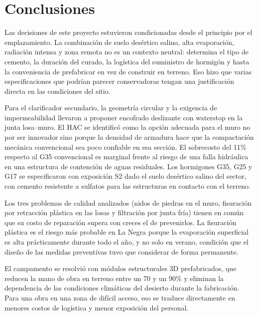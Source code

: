 \section{Conclusiones}

Las decisiones de este proyecto estuvieron condicionadas desde el principio por el emplazamiento. La combinación de suelo desértico salino, alta evaporación, radiación intensa y zona remota no es un contexto neutral: determina el tipo de cemento, la duración del curado, la logística del suministro de hormigón y hasta la conveniencia de prefabricar en vez de construir en terreno. Eso hizo que varias especificaciones que podrían parecer conservadoras tengan una justificación directa en las condiciones del sitio.

Para el clarificador secundario, la geometría circular y la exigencia de impermeabilidad llevaron a proponer encofrado deslizante con waterstop en la junta losa--muro. El HAC se identificó como la opción adecuada para el muro no por ser innovador sino porque la densidad de armadura hace que la compactación mecánica convencional sea poco confiable en esa sección. El sobrecosto del 11\% respecto al G35 convencional es marginal frente al riesgo de una falla hidráulica en una estructura de contención de aguas residuales. Los hormigones G35, G25 y G17 se especificaron con exposición S2 dado el suelo desértico salino del sector, con cemento resistente a sulfatos para las estructuras en contacto con el terreno.

Los tres problemas de calidad analizados (nidos de piedras en el muro, fisuración por retracción plástica en las losas y filtración por junta fría) tienen en común que su costo de reparación supera con creces el de prevenirlos. La fisuración plástica es el riesgo más probable en La Negra porque la evaporación superficial es alta prácticamente durante todo el año, y no solo en verano, condición que el diseño de las medidas preventivas tuvo que considerar de forma permanente.

El campamento se resolvió con módulos estructurales 3D prefabricados, que reducen la mano de obra en terreno entre un 70 y un 90\% y eliminan la dependencia de las condiciones climáticas del desierto durante la fabricación. Para una obra en una zona de difícil acceso, eso se traduce directamente en menores costos de logística y menor exposición del personal.
